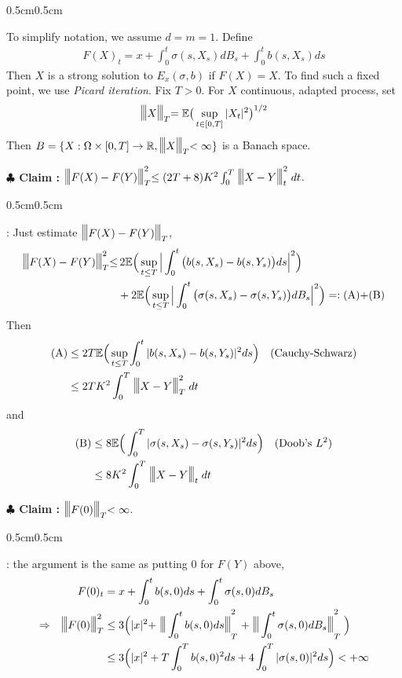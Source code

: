 \documentclass[10pt,a4paper]{article}
\newenvironment{proof}
{\begin{changemargin}{0.5cm}{0.5cm} 
	}%
	{\end{changemargin}
}
\newenvironment{subproof}
{\begin{changemargin}{0.5cm}{0.5cm} 
	}%
	{\end{changemargin}
}
\newenvironment{p}
{\begin{proof} 
	}%
	{\end{proof}
}
\begin{document}
\begin{p}
\pf To simplify notation, we assume $d=m=1$. Define
\begin{align*}
F(X)_t = x + \int_0^t \sigma(s, X_s) dB_s + \int_0^t b(s, X_s) ds
\end{align*}
Then $X$ is a strong solution to $E_x(\sigma, b)$ if $F(X)=X$. To find such a fixed point, we use \emph{Picard iteration}. Fix $T>0$. For $X$ continuous, adapted process, set
\begin{align*}
\tnorms{X}{T} = \avg \big( \sup_{t\in [0, T]} |X_t|^2 \big)^{1/2}
\end{align*}
Then $B = \{X : \Omega \times [0, T] \rightarrow \reals, \tnorms{X}{T} < \infty \}$ is a Banach space.

\textbf{$\clubsuit$ Claim :} $\tnorms{F(X) - F(Y)}{T}^2 \leq (2T+8)K^2 \int_0^T \tnorms{X-Y}{t}^2 dt$. 
\begin{subproof}
: Just estimate $\tnorms{F(X)-F(Y)}{T}$,
\begin{align*}
\tnorms{F(X)-F(Y)}{T}^2 \leq & \, 2\avg \Big( \sup_{t\leq T} \Big| \int_0^t \big( b(s, X_s) - b(s, Y_s) \big) ds \Big|^2  \Big) \\
& + 2\avg \Big( \sup_{t\leq T} \Big| \int_0^t \big( \sigma(s, X_s) - \sigma(s, Y_s) \big) dB_s \Big|^2 \Big) =: \text{(A)+(B)}
\end{align*}
Then
\begin{align*}
\text{(A)} & \leq 2T \avg \Big( \sup_{t\leq T} \int_0^t |b(s, X_s) - b(s, Y_s)|^2 ds \Big) \quad \text{(Cauchy-Schwarz)} \\
& \leq 2 TK^2 \int_0^T \tnorms{X-Y}{T}^2  dt 
\end{align*}
and
\begin{align*}
\text{(B)} & \leq 8\avg \Big( \int_0^T |\sigma(s, X_s) - \sigma(s, Y_s)|^2 ds \Big) \quad \text{(Doob's }L^2) \\
& \leq 8K^2  \int_0^T \tnorms{X-Y}{t} dt
\end{align*}
\end{subproof}
\textbf{$\clubsuit$ Claim :} $\tnorms{F(0)}{T} < \infty$.
\begin{subproof}
: the argument is the same as putting 0 for $F(Y)$ above,
\begin{align*}
 F(0)_t &= x + \int_0^t b(s, 0) ds + \int_0^t \sigma(s, 0) dB_s \\
\Rightarrow \quad \tnorms{F(0)}{T}^2 &\leq 3\Big( |x|^2 + \tnorms{\int_0^t b(s, 0) ds}{T}^2 + \tnorms{\int_0^t \sigma(s, 0) dB_s}{T}^2 \Big) \\
&\leq 3\Big( |x|^2 +  T\int_0^T b(s, 0)^2 ds + 4\int_0^T |\sigma(s,0)|^2 ds  \Big) < + \infty

\end{align*}
\end{subproof}
\end{p}
\end{document}
